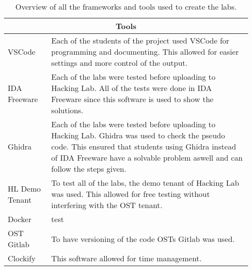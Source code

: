 \begin{center}
    \begin{table}[H]
        \centering
        \begin{tabular}{ |p{4.1cm}|p{10cm}| } 
            \hline
            \multicolumn{2}{||c||}{\textbf{Tools}} \\
            \hline
            \hline
                VSCode & Each of the students of the project used VSCode for programming and documenting. This allowed for easier settings and more control of the output. \\
            \hline
                IDA Freeware & Each of the labs were tested before uploading to Hacking Lab. All of the tests were done in IDA Freeware since this software is used to show the solutions.  \\
            \hline
                Ghidra & Each of the labs were tested before uploading to Hacking Lab. Ghidra was used to check the pseudo code. This ensured that students using Ghidra instead of IDA Freeware have a solvable problem aswell and can follow the steps given. \\
            \hline
                HL Demo Tenant & 
                To test all of the labs, the demo tenant of Hacking Lab was used. This allowed for free testing without interfering with the OST tenant.  \\ 
            \hline
                Docker & test \\
            \hline
                OST Gitlab & 
                To have versioning of the code OSTs Gitlab was used.  \\ 
            \hline
                Clockify & 
                This software allowed for time management. \\ 
            \hline
        \end{tabular}
        \caption{Overview of all the frameworks and tools used to create the labs.}
        \label{tab:tools}
    \end{table}
\end{center}

